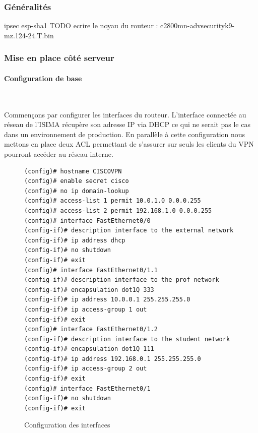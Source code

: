 \subsubsection{Généralités}
ipsec esp-sha1
TODO ecrire le noyau du routeur : c2800mn-advsecurityk9-mz.124-24.T.bin


\subsubsection{Mise en place côté serveur}

\paragraph{Configuration de base}
~

Commençons par configurer les interfaces du routeur. L'interface connectée au réseau de l'ISIMA récupère son adresse IP via DHCP ce qui ne serait pas le cas dans un environnement de production. En parallèle à cette configuration nous mettons en place deux ACL permettant de s'assurer sur seuls les clients du VPN pourront accéder au réseau interne.
\begin{figure}[H]
	\begin{center}
		\begin{minipage}{0.90\textwidth}
			\begin{lstlisting}[frame=trBL]
(config)# hostname CISCOVPN
(config)# enable secret cisco
(config)# no ip domain-lookup
(config)# access-list 1 permit 10.0.1.0 0.0.0.255
(config)# access-list 2 permit 192.168.1.0 0.0.0.255
(config)# interface FastEthernet0/0
(config-if)# description interface to the external network
(config-if)# ip address dhcp
(config-if)# no shutdown
(config-if)# exit
(config)# interface FastEthernet0/1.1
(config-if)# description interface to the prof network
(config-if)# encapsulation dot1Q 333
(config-if)# ip address 10.0.0.1 255.255.255.0
(config-if)# ip access-group 1 out
(config-if)# exit
(config)# interface FastEthernet0/1.2
(config-if)# description interface to the student network
(config-if)# encapsulation dot1Q 111
(config-if)# ip address 192.168.0.1 255.255.255.0
(config-if)# ip access-group 2 out
(config-if)# exit
(config)# interface FastEthernet0/1
(config-if)# no shutdown
(config-if)# exit
			\end{lstlisting}
		\end{minipage}
	\end{center}
	\caption{Configuration des interfaces}
	\label{configuration_interfaces}
\end{figure}

